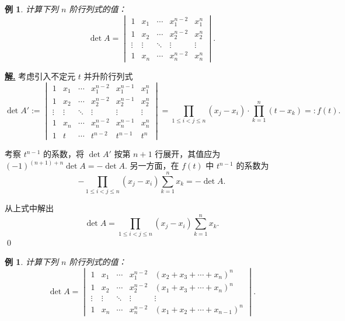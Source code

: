 \documentclass[10pt,openany]{article}
\theoremstyle{thmstyle} %
\theoremstyle{defstyle} %
\theoremstyle{prostyle} %
\theoremstyle{exastyle}
\newtheorem{example}[theorem]{例}
\theoremstyle{remstyle}
\newenvironment{solution}{\par\underline{\textbf{解.}} \;\fangsong}{\qed\par}
\begin{document}
\begin{example} \label{4.1.12}
	计算下列 \( n \) 阶行列式的值：
	\[ \det A= \begin{vmatrix}
		1 & x_1 & \cdots & x_1^{n-2} & x_1^{n} \\
		1 & x_2 & \cdots & x_2^{n-2} & x_2^{n} \\
		\vdots & \vdots & \ddots & \vdots & \vdots \\
		1 & x_n & \cdots & x_n^{n-2} & x_n^{n}
	\end{vmatrix}. \]
\end{example}

\begin{solution}
	考虑引入不定元 \( t \) 并升阶行列式
	\[ \det A':=\begin{vmatrix}
		1 & x_1 & \cdots & x_1^{n-2} & x_1^{n-1} & x_1^{n} \\
		1 & x_2 & \cdots & x_2^{n-2} & x_2^{n-1} & x_2^{n} \\
		\vdots & \vdots & \ddots & \vdots & \vdots & \vdots \\
		1 & x_n & \cdots & x_n^{n-2} & x_n^{n-1} & x_n^{n} \\
		1 & t & \cdots & t^{n-2} & t^{n-1} & t^n
	\end{vmatrix}= \prod_{1 \leq i<j \leq n}^{} (x_j-x_i) \cdot \prod_{k=1}^{n} (t-x_k)=:f(t). \]
	
	考察 \( t^{n-1} \) 的系数，将 \( \det A' \) 按第 \( n+1 \) 行展开，其值应为 \( (-1)^{(n+1)+n} \det A= -\det A \). 另一方面，在 \( f(t) \) 中 \( t^{n-1} \) 的系数为
	\[ -\prod_{1 \leq i<j \leq n}^{} (x_j-x_i) \sum_{k=1}^{n} x_k= -\det A. \]
	
	从上式中解出
	\[ \det A= \prod_{1 \leq i<j \leq n}^{} (x_j-x_i) \sum_{k=1}^{n} x_k. \]
\end{solution}


\begin{example}
	计算下列 \( n \) 阶行列式的值：
	\[ \det A= \begin{vmatrix}
		1 & x_1 & \cdots & x_1^{n-2} & (x_2+x_3+\cdots+x_n)^{n} \\
		1 & x_2 & \cdots & x_2^{n-2} & (x_1+x_3+\cdots+x_n)^{n} \\
		\vdots & \vdots & \ddots & \vdots & \vdots \\
		1 & x_n & \cdots & x_n^{n-2} & (x_1+x_2+\cdots+x_{n-1})^{n}
	\end{vmatrix}. \]
\end{example}
\end{document}
